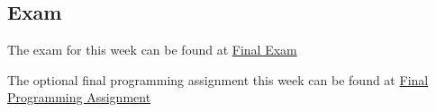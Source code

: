 \subsection{Exam}

The exam for this week can be found at \href{https://applied.cs.colorado.edu/mod/quiz/view.php?id=52201}{Final Exam}   \vspace*{1em}

The optional final programming assignment this week can be found at \href{https://applied.cs.colorado.edu/mod/quiz/view.php?id=51924}{Final Programming Assignment}  